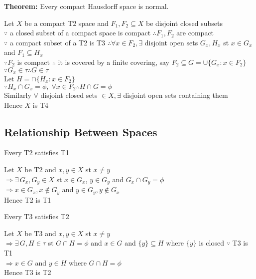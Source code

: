 \documentclass{article}
\begin{document}
\textbf{Theorem:} Every compact Hausdorff space is normal.
\begin{tcolorbox}[colback=lightgray!10,colframe=lightgray!10, fontupper=\linespread{1.5}\selectfont]
	Let $X$ be a compact T2 space and $F_1, F_2 \subseteq X$ be disjoint closed subsets \\
	$\because$ a closed subset of a compact space is compact $\therefore F_1, F_2$ are compact \\
	$\because$ a compact subset of a T2 is T3 $\therefore \forall x \in F_2, \exists$ disjoint open sets $G_x, H_x$ st $x \in G_x$ and $F_1 \subseteq H_x$ \\
	$\because F_2$ is compact $\therefore$ it is covered by a finite covering, say $F_2 \subseteq  G = \cup \{G_x : x \in F_2\}$ \\
	$\because G_x \in \tau \therefore G \in \tau$ \\
	Let $H = \cap \{H_x: x \in F_2\}$ \\
	$\because H_x \cap G_x = \phi, \; \forall x \in F_2 \therefore H \cap G = \phi$ \\
	Similarly $\forall$ disjoint closed sets $\in X, \exists$ disjoint open sets containing them \\
	Hence $X$ is T4
\end{tcolorbox}

\subsection{Relationship Between Spaces}

Every T2 satisfies T1
\begin{tcolorbox}[colback=lightgray!10,colframe=lightgray!10, fontupper=\linespread{1.5}\selectfont]
	Let $X$ be T2 and $x,y \in X$ st $x \not= y$ \\
	$\Rightarrow \exists \, G_x,G_y \in X$ st $x \in G_x$, $y \in G_y$ and $G_x \cap G_y = \phi$ \\
	$\Rightarrow x \in G_x, x \not\in G_y$ and $y \in G_y, y \not\in G_x$ \\
	Hence T2 is T1
\end{tcolorbox}

Every T3 satisfies T2
\begin{tcolorbox}[colback=lightgray!10,colframe=lightgray!10, fontupper=\linespread{1.5}\selectfont]
	Let $X$ be T3 and $x,y \in X$ st $x \not= y$ \\
	$\Rightarrow \exists \, G,H \in \tau$ st $G \cap H = \phi$ and $x \in G$ and $\{y\} \subseteq H$ where $\{y\}$ is closed $\because$ T3 is T1 \\
	$\Rightarrow x \in G$ and $y \in H$ where $G \cap H = \phi$ \\
	Hence T3 is T2
\end{tcolorbox}
\end{document}
